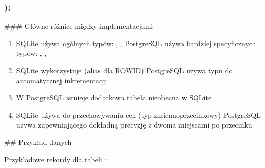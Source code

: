 \documentclass[letterpaper,10pt,polish]{sphinxmanual}
\begin{document}
\subsubsection{);}
\label{\detokenize{rozdzial3/index:id16}}
\sphinxAtStartPar
\#\#\# Główne różnice między implementacjami
\begin{enumerate}
%
\item {} 
\sphinxAtStartPar
{}
\sphinxhyphen{} SQLite używa ogólnych typów: , , 
\sphinxhyphen{} PostgreSQL używa bardziej specyficznych typów: , , 

\item {} 
\sphinxAtStartPar
{}
\sphinxhyphen{} SQLite wykorzystuje  (alias dla ROWID)
\sphinxhyphen{} PostgreSQL używa typu  do automatycznej inkrementacji

\item {} 
\sphinxAtStartPar
{}
\sphinxhyphen{} W PostgreSQL istnieje dodatkowa tabela  nieobecna w SQLite

\item {} 
\sphinxAtStartPar
{}
\sphinxhyphen{} SQLite używa  do przechowywania cen (typ zmiennoprzecinkowy)
\sphinxhyphen{} PostgreSQL używa  zapewniającego dokładną precyzję z dwoma miejscami po przecinku

\end{enumerate}

\sphinxAtStartPar
\#\# Przykład danych

\sphinxAtStartPar
Przykładowe rekordy dla tabeli :
\end{document}
